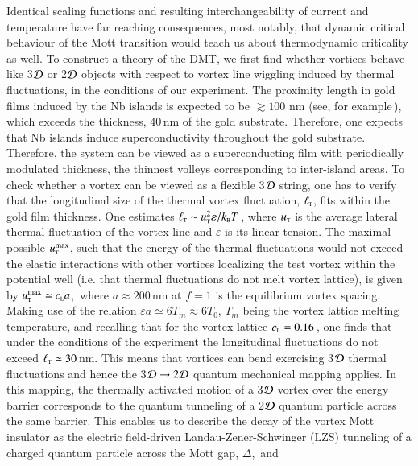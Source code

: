 \documentclass[aps,twocolumn,prl,10pt,amsmath,amssymb,nofootinbib,showpacs,superscriptaddress,floatfix]{revtex4-1}
\newcommand{\rs}{\rm\scriptscriptstyle}
\begin{document}
Identical scaling functions and resulting interchangeability of current and temperature have far reaching consequences, most notably, that
dynamic critical behaviour of the Mott transition would teach us about thermodynamic criticality as well.
To construct a theory of the DMT, we first find whether vortices behave like 3${\cal D}$ or 2${\cal D}$ objects with respect to vortex line wiggling induced by thermal fluctuations, in the conditions of our experiment.  The proximity length in gold films induced by the Nb islands is expected to be $\gtrsim 100\,$\,nm (see, for example\,\cite{Mota}), which exceeds the thickness, 40\,nm of the gold substrate. Therefore, one expects that Nb islands induce superconductivity throughout the gold substrate. Therefore, the system can be viewed as a superconducting film with periodically modulated thickness, the thinnest volleys corresponding to inter-island areas.  To check whether a vortex can be viewed as a flexible 3${\cal D}$ string, one has to verify that the longitudinal size of the thermal vortex fluctuation, $\ell_{\rs T}$, fits within the gold film thickness. One estimates $\ell_{\rs T}\sim u_{\rs T}^2\varepsilon/k_{\rs B}T$\,\cite{Nelson}, where $u_{\rs T}$ is the average lateral thermal fluctuation of the vortex line and $\varepsilon$ is its linear tension. The maximal possible $u_{\rs T}^{\mathrm{max}}$, such that the energy of the thermal fluctuations would not exceed the elastic interactions with other vortices localizing the test vortex within the potential well (i.e. that thermal fluctuations do not melt vortex lattice), is given by $u_{\rs T}^{\mathrm{max}}\simeq c_{\rs L}a$,\,\cite{Vinokur:1998,Blatter:1994} where $a\approx 200$\,nm at $f=1$ is the equilibrium vortex spacing. Making use of the relation $\varepsilon a\simeq 6T_m\approx 6T_0$, $T_m$ being the vortex lattice  melting temperature,   
and recalling that for the vortex lattice $c_{\rs L}=0.16$\,\cite{Vinokur:1998}, one finds that under the conditions of the experiment the longitudinal fluctuations do not exceed $\ell_{\rs T}\simeq 30$\,nm. This means that vortices can bend exercising 3${\cal D}$ thermal fluctuations and hence the 3${\cal D}\to2{\cal D}$ quantum mechanical mapping applies.
In this mapping, the thermally activated motion of a 3${\cal D}$ vortex over the energy barrier corresponds to the quantum tunneling of a 2${\cal D}$ quantum particle across the same barrier.
This enables us to describe the decay of the vortex Mott insulator as the electric field-driven Landau-Zener-Schwinger (LZS) tunneling of a charged quantum particle across the Mott gap, $\Delta$,\,\cite{Oka:2003,Oka:2010} and 
\end{document}
